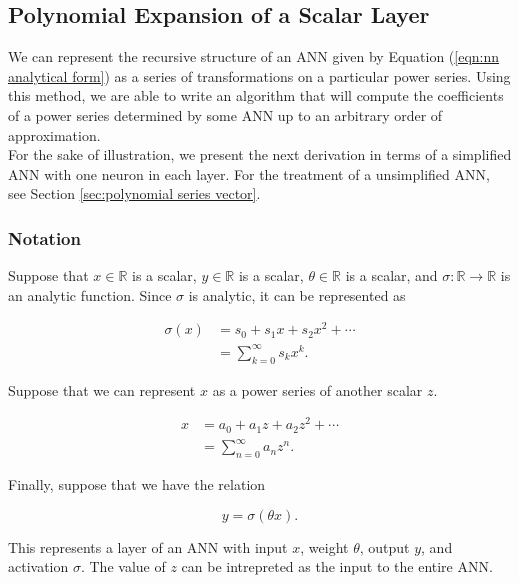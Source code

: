 \subsection{Polynomial Expansion of a Scalar Layer}
\label{sec:polynomial series scalar}

We can represent the recursive structure of an ANN given by Equation (\ref{eqn:nn analytical form}) as a series of transformations on a particular power series. Using this method, we are able to write an algorithm that will compute the coefficients of a power series determined by some ANN up to an arbitrary order of approximation.\\

For the sake of illustration, we present the next derivation in terms of a simplified ANN with one neuron in each layer. For the treatment of a unsimplified ANN, see Section \ref{sec:polynomial series vector}.

\subsubsection{Notation}
Suppose that $x \in \mathbb{R}$ is a scalar, $y \in \mathbb{R}$ is a scalar, $\theta \in \mathbb{R}$ is a scalar, and $\sigma: \mathbb{R} \to \mathbb{R}$ is an analytic function. Since $\sigma$ is analytic, it can be represented as

\begin{align}
    \sigma(x)
    &= s_0 + s_1 x + s_2 x^2 + \cdots \nonumber \\
	&= \sum_{k=0}^{\infty} s_{k} x^{k}.
	\label{eqn:scalar layer activation}
\end{align}

Suppose that we can represent $x$ as a power series of another scalar $z$.

\begin{align}
    x
    &= a_0 + a_1 z + a_2 z^2 + \cdots \nonumber \\
	&= \sum_{n=0}^{\infty} a_{n} z^{n}.
	\label{eqn:scalar x series}
\end{align}

Finally, suppose that we have the relation

\begin{equation}
	y = \sigma(\theta x).
	\label{eqn:scalar layer relation}
\end{equation}

This represents a layer of an ANN with input $x$, weight $\theta$, output $y$, and activation $\sigma$. The value of $z$ can be intrepreted as the input to the entire ANN.

